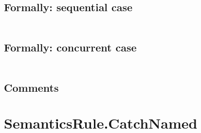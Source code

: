 \documentclass{book}
\begin{document}
  \subsection{Formally: sequential case}
  \begin{align}
  \end{align} 

  \subsection{Formally: concurrent case}
  \begin{align}
  \end{align} 

    \subsection{Comments}

\section{SemanticsRule.CatchNamed \label{sec:SemanticsRule.CatchNamed}}
\end{document}
